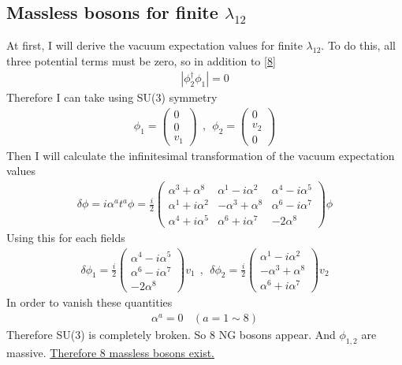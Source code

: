 \subsection{Massless bosons for finite $\lambda_{12}$}
At first, I will derive the vacuum expectation values for finite $\lambda_{12}$. To do this, all three potential terms must be zero, so in addition to \eqref{8}
\begin{align*}
    |\phi_2^{\dag}\phi_1|=0
\end{align*}
Therefore I can take using SU(3) symmetry
\begin{align*}
    \phi_1=\begin{pmatrix}
        0\\0\\v_1
    \end{pmatrix}\ \ ,\ \ \phi_2=\begin{pmatrix}
        0\\v_2\\0
    \end{pmatrix}
\end{align*}
Then I will calculate the infinitesimal transformation of the vacuum expectation values
\begin{align*}
    \delta\phi=i\alpha^at^a\phi=\frac{i}{2}\begin{pmatrix}
        \alpha^3+\alpha^8&\alpha^1-i\alpha^2&\alpha^4-i\alpha^5\\
        \alpha^1+i\alpha^2&-\alpha^3+\alpha^8&\alpha^6-i\alpha^7\\
        \alpha^4+i\alpha^5&\alpha^6+i\alpha^7&-2\alpha^8
    \end{pmatrix}\phi
\end{align*}
Using this for each fields
\begin{align*}
    \delta\phi_1=\frac{i}{2}\begin{pmatrix}
        \alpha^4-i\alpha^5\\
        \alpha^6-i\alpha^7\\
        -2\alpha^8
    \end{pmatrix}v_1\ \ ,\ \ \delta\phi_2=\frac{i}{2}\begin{pmatrix}
        \alpha^1-i\alpha^2\\
        -\alpha^3+\alpha^8\\
        \alpha^6+i\alpha^7
    \end{pmatrix}v_2
\end{align*}
In order to vanish these quantities
\begin{align*}
    \alpha^a=0\ \ \ \ (a=1\sim8)
\end{align*}
Therefore SU(3) is completely broken. So 8 NG bosons appear. And $\phi_{1,2}$ are massive. \underline{Therefore 8 massless bosons exist.}

